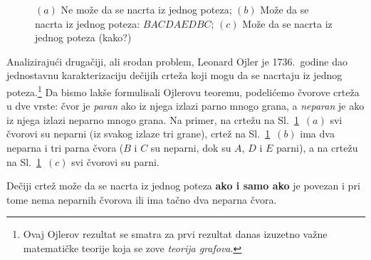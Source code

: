 \begin{figure}
  \centering
  
  \caption{$(a)$ Ne mo\v ze da se nacrta iz jednog poteza; $(b)$ Mo\v ze da se nacrta iz jednog poteza: $BACDAEDBC$; $(c)$ Mo\v ze da se nacrta iz jednog poteza (kako?)}
  \label{ft01.fig.1potez2}
\end{figure}

Analiziraju\'ci druga\v ciji, ali srodan problem, Leonard Ojler je 1736.\ godine dao jednostavnu karakterizaciju de\v cijih crte\v za
koji mogu da se nacrtaju iz jednog poteza.\footnote{Ovaj Ojlerov rezultat se smatra za prvi rezultat danas izuzetno va\v zne
matemati\v cke teorije koja se zove \emph{teorija grafova}.}
Da bismo lak\v se formulisali Ojlerovu teoremu, podeli\'cemo \v cvorove crte\v za
u dve vrste: \v cvor je \emph{paran} ako iz njega izlazi parno mnogo grana, a \emph{neparan} je ako iz njega izlazi
neparno mnogo grana. Na primer, na crte\v zu na Sl.~\ref{ft01.fig.1potez2}~$(a)$ svi \v cvorovi su neparni (iz svakog izlaze tri grane),
crte\v z na Sl.~\ref{ft01.fig.1potez2}~$(b)$ ima dva neparna i tri parna \v cvora ($B$ i $C$ su neparni, dok su $A$, $D$ i $E$ parni),
a na crte\v zu na Sl.~\ref{ft01.fig.1potez2}~$(c)$ svi \v cvorovi su parni.

\begin{THM}[Ojler]
  De\v ciji crte\v z mo\v ze da se nacrta iz jednog poteza \textbf{ako i samo ako} je povezan i pri tome nema neparnih \v cvorova ili ima
  ta\v cno dva neparna \v cvora.
\end{THM}

